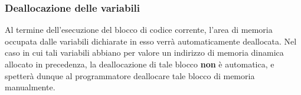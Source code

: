 \subsubsection{Deallocazione delle variabili}
Al termine dell'esecuzione del blocco di codice corrente, l'area di memoria occupata dalle variabili dichiarate in esso verrà automaticamente
deallocata. Nel caso in cui tali variabili abbiano per valore un indirizzo di memoria dinamica allocato in precedenza, la deallocazione di tale blocco 
\textbf{non} è automatica, e spetterà dunque al programmatore deallocare tale blocco di memoria manualmente.

\vspace{0.5cm}
